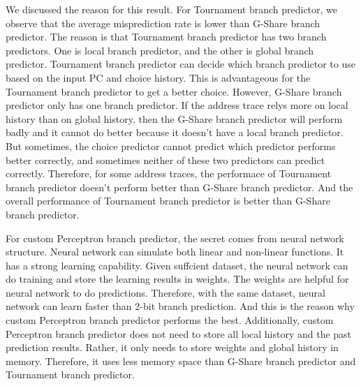 \documentclass[conference]{IEEEtran}
\begin{document}
We discussed the reason for this result. For Tournament branch predictor, we observe that the average misprediction rate is lower than G-Share branch predictor. 
The reason is that Tournament branch predictor has two branch predictors. One is local branch predictor, and the other is global branch predictor. Tournament branch predictor can decide which branch predictor to use 
based on the input PC and choice history. This is advantageous for the Tournament branch predictor to get a better choice. However, G-Share branch predictor only has one branch predictor. 
If the address trace relys more on local history than on global history, then the G-Share branch predictor will perform badly and it cannot do better because it doesn't have a local branch predictor. 
But sometimes, the choice predictor cannot predict which predictor performs better correctly, and sometimes neither of these two predictors can predict correctly. Therefore, for some address traces, the performace of Tournament 
branch predictor doesn't perform better than G-Share branch predictor. And the overall performance of Tournament branch predictor is better than G-Share branch predictor. 

For custom Perceptron branch predictor, the secret comes from neural network structure. Neural network can simulate both linear and non-linear functions. It has a strong learning capability. Given suffcient dataset, the neural network can do training and store the learning results in weights.
The weights are helpful for neural network to do predictions. Therefore, with the same dataset, neural network can learn faster than 2-bit branch prediction. And this is the reason why custom Perceptron branch predictor performs the best. 
Additionally, custom Perceptron branch predictor does not need to store all local history and the past prediction results. Rather, it only needs to store weights and global history in memory. Therefore, it uses
less memory space than G-Share branch predictor and Tournament branch predictor. 




\end{document}
